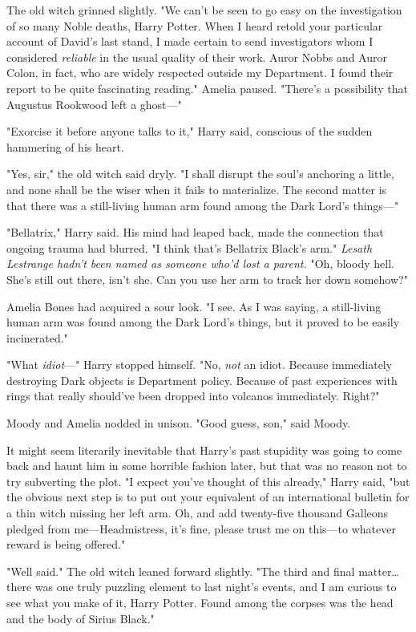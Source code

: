 The old witch grinned slightly. "We can't be seen to go easy on the
investigation of so many Noble deaths, Harry Potter. When I heard retold your
particular account of David's last stand, I made certain to send investigators
whom I considered \emph{reliable} in the usual quality of their work. Auror
Nobbs and Auror Colon, in fact, who are widely respected outside my Department.
I found their report to be quite fascinating reading." Amelia paused. "There's
a possibility that Augustus Rookwood left a ghost---"

"Exorcise it before anyone talks to it," Harry said, conscious of the sudden
hammering of his heart.

"Yes, sir," the old witch said dryly. "I shall disrupt the soul's anchoring a
little, and none shall be the wiser when it fails to materialize. The second
matter is that there was a still-living human arm found among the Dark Lord's
things---"

"Bellatrix," Harry said. His mind had leaped back, made the connection that
ongoing trauma had blurred. "I think that's Bellatrix Black's arm."
\emph{Lesath Lestrange hadn't been named as someone who'd lost a parent.} "Oh,
bloody hell. She's still out there, isn't she. Can you use her arm to track her
down somehow?"

Amelia Bones had acquired a sour look. "I see. As I was saying, a still-living
human arm was found among the Dark Lord's things, but it proved to be easily
incinerated."

"What \emph{idiot}---" Harry stopped himself. "No, \emph{not} an idiot. Because
immediately destroying Dark objects is Department policy. Because of past
experiences with rings that really should've been dropped into volcanos
immediately. Right?"

Moody and Amelia nodded in unison. "Good guess, son," said Moody.

It might seem literarily inevitable that Harry's past stupidity was going to
come back and haunt him in some horrible fashion later, but that was no reason
not to try subverting the plot. "I expect you've thought of this already,"
Harry said, "but the obvious next step is to put out your equivalent of an
international bulletin for a thin witch missing her left arm. Oh, and add
twenty-five thousand Galleons pledged from me---Headmistress, it's fine, please
trust me on this---to whatever reward is being offered."

"Well said." The old witch leaned forward slightly. "The third and final
matter{\ldots} there was one truly puzzling element to last night's events, and
I am curious to see what you make of it, Harry Potter. Found among the corpses
was the head and the body of Sirius Black."


